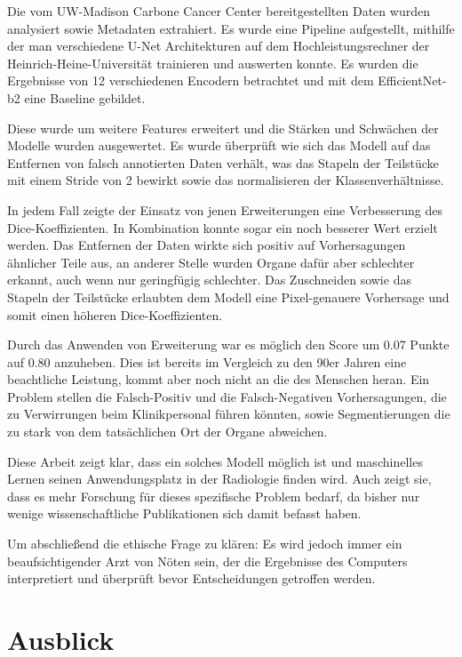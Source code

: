 Die vom UW-Madison Carbone Cancer Center bereitgestellten Daten wurden analysiert sowie Metadaten extrahiert. Es wurde eine Pipeline aufgestellt, mithilfe der man verschiedene U-Net Architekturen auf dem Hochleistungsrechner der Heinrich-Heine-Universität trainieren und auswerten konnte. Es wurden die Ergebnisse von 12 verschiedenen Encodern betrachtet und mit dem EfficientNet-b2 eine Baseline gebildet.

Diese wurde um weitere Features erweitert und die Stärken und Schwächen der Modelle wurden ausgewertet. Es wurde überprüft wie sich das Modell auf das Entfernen von falsch annotierten Daten verhält, was das Stapeln der Teilstücke mit einem Stride von 2 bewirkt sowie das normalisieren der Klassenverhältnisse. 

In jedem Fall zeigte der Einsatz von jenen Erweiterungen eine Verbesserung des Dice-Koeffizienten. In Kombination konnte sogar ein noch besserer Wert erzielt werden. Das Entfernen der Daten wirkte sich positiv auf Vorhersagungen ähnlicher Teile aus, an anderer Stelle wurden Organe dafür aber schlechter erkannt, auch wenn nur geringfügig schlechter. Das Zuschneiden sowie das Stapeln der Teilstücke erlaubten dem Modell eine Pixel-genauere Vorhersage und somit einen höheren Dice-Koeffizienten.

Durch das Anwenden von Erweiterung war es möglich den Score um 0.07 Punkte auf 0.80 anzuheben. Dies ist bereits im Vergleich zu den 90er Jahren eine beachtliche Leistung, kommt aber noch nicht an die des Menschen heran. Ein Problem stellen die Falsch-Positiv und die Falsch-Negativen Vorhersagungen, die zu Verwirrungen beim Klinikpersonal führen könnten, sowie Segmentierungen die zu stark von dem tatsächlichen Ort der Organe abweichen.

Diese Arbeit zeigt klar, dass ein solches Modell möglich ist und maschinelles Lernen seinen Anwendungsplatz in der Radiologie finden wird. Auch zeigt sie, dass es mehr Forschung für dieses spezifische Problem bedarf, da bisher nur wenige wissenschaftliche Publikationen sich damit befasst haben.

Um abschließend die ethische Frage zu klären: Es wird jedoch immer ein beaufsichtigender Arzt von Nöten sein, der die Ergebnisse des Computers interpretiert und überprüft bevor Entscheidungen getroffen werden.

\section{Ausblick}

